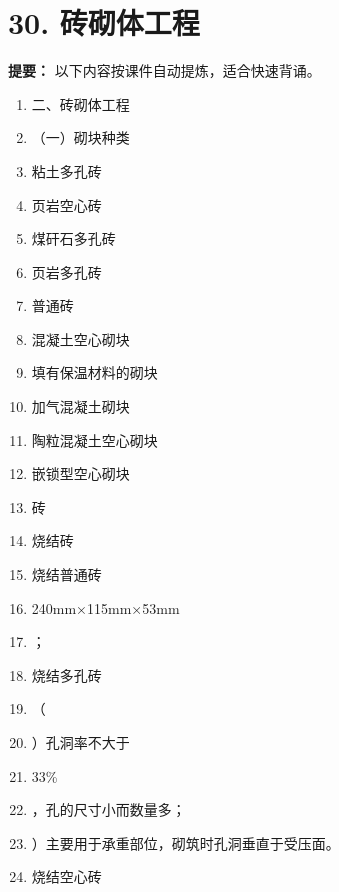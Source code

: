 \documentclass[UTF8,fontset=fandol,11pt]{ctexart}
\begin{document}
\newpage

\section*{30. 砖砌体工程}


\begin{mainbox}

\textbf{提要：} 以下内容按课件自动提炼，适合快速背诵。

\end{mainbox}

\begin{enumerate}[label=\arabic*.]

\item 二、砖砌体工程

\item （一）砌块种类

\item 粘土多孔砖

\item 页岩空心砖

\item 煤矸石多孔砖

\item 页岩多孔砖

\item 普通砖

\item 混凝土空心砌块

\item 填有保温材料的砌块

\item 加气混凝土砌块

\item 陶粒混凝土空心砌块

\item 嵌锁型空心砌块

\item 砖

\item 烧结砖

\item 烧结普通砖

\item 240mm×115mm×53mm

\item ；

\item 烧结多孔砖

\item （

\item ）孔洞率不大于

\item 33\%

\item ，孔的尺寸小而数量多；

\item ）主要用于承重部位，砌筑时孔洞垂直于受压面。

\item 烧结空心砖

\end{enumerate}
\end{document}
